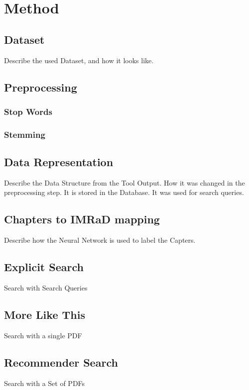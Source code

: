 \chapter{Method}
\label{cha:method}

\section{Dataset}
\label{sec:dataset}

Describe the used Dataset, and how it looks like.

\section{Preprocessing}
\label{sec:preprocessing}

\subsection{Stop Words}
\label{subsec:stop-words}

\subsection{Stemming}
\label{subsec:stemming}

\section{Data Representation}
\label{sec:data-representation}

Describe the Data Structure from the Tool Output. How it was changed in the preprocessing step. It is stored in the Database. It was used for search queries.  

\section{Chapters to IMRaD mapping}
\label{sec:chapters-to-imrad-mapping}

Describe how the Neural Network is used to label the Capters.


\section{Explicit Search}
\label{sec:explicit-search}

Search with Search Queries

\section{More Like This} %
\label{sec:more-like-this}

Search with a single PDF

\section{Recommender Search}
\label{sec:recommender-search}

Search with a Set of PDFs